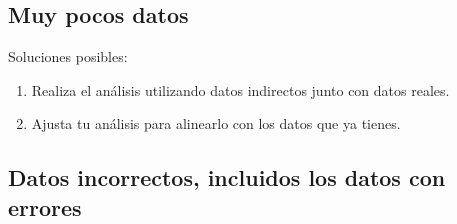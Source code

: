 \subsection{Muy pocos datos}

Soluciones posibles:
\begin{enumerate}
    \item Realiza el an\'alisis utilizando datos indirectos junto con datos reales. 
    \item Ajusta tu an\'alisis para alinearlo con los datos que ya tienes.
\end{enumerate}


\subsection{Datos incorrectos, incluidos los datos con errores}

